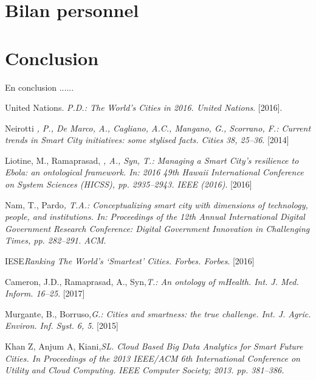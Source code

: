 \documentclass[french, a4paper, 12pt]{report}
\begin{document}
\section{Bilan personnel}
\section{Conclusion}
En conclusion ...... 

% 
%  
{} 
\begin{thebibliography}{9}
United Nations. \emph{P.D.: The World’s Cities in 2016. United Nations}. [2016].

 Neirotti \emph{, P., De Marco, A., Cagliano, A.C., Mangano, G., Scorrano, F.: Current trends in Smart City initiatives: some stylised facts. Cities 38, 25–36}. [2014]


  Liotine, M., Ramaprasad, \emph{, A., Syn, T.: Managing a Smart City’s resilience to Ebola: an ontological framework. In: 2016 49th Hawaii International Conference on System Sciences (HICSS), pp. 2935–2943. IEEE (2016)}. [2016]

 Nam, T., Pardo\emph{, T.A.: Conceptualizing smart city with dimensions of technology, people, and institutions. In: Proceedings of the 12th Annual International Digital Government Research Conference: Digital Government Innovation in Challenging Times, pp. 282–291. ACM}.

IESE\emph{Ranking The World’s ‘Smartest’ Cities. Forbes. Forbes}. [2016]

Cameron, J.D., Ramaprasad, A., Syn,\emph{T.: An ontology of mHealth. Int. J. Med. Inform. 16–25}. [2017]

 Murgante, B., Borruso,\emph{G.: Cities and smartness: the true challenge. Int. J. Agric. Environ. Inf. Syst. 6, 5}. [2015]

Khan Z, Anjum A, Kiani,\emph{SL. Cloud Based Big Data Analytics for Smart Future Cities. In Proceedings of the 2013 IEEE/ACM 6th International Conference on Utility and Cloud Computing. IEEE Computer Society; 2013. pp. 381–386.}



\end{thebibliography}
\end{document}
